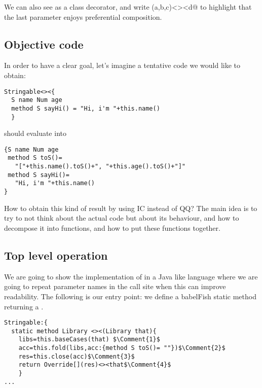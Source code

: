 We can also see \Q@Override@ as a class decorator, and
write \Q@Override(a,b,c)<><d@ to highlight that the last parameter enjoys preferential composition.

\subsection*{Objective code}
In order to have a clear goal,
let's imagine a tentative code we would like to obtain:

\begin{lstlisting}
Stringable<><{
  S name Num age
  method S sayHi() = "Hi, i'm "+this.name()
  }
\end{lstlisting}

\noindent should evaluate into

\begin{lstlisting}
{S name Num age
 method S toS()=
   "["+this.name().toS()+", "+this.age().toS()+"]"
 method S sayHi()=
   "Hi, i'm "+this.name()
}
\end{lstlisting}

How to obtain this kind of result by using IC instead of QQ?
The main idea is to try to not think about the actual code but about
its behaviour, and how to decompose it into functions, and how to
put these functions together.



\subsection*{Top level operation}
We are going to show the implementation of \Q@Stringable@ in a Java like language where
we are going to repeat parameter names in the call site when this can improve readability.
The following is our entry point: we define a babelFish static method
returning a \Q@Library@.

\begin{lstlisting}
Stringable:{
  static method Library <><(Library that){
    libs=this.baseCases(that) $\Comment{1}$
    acc=this.fold(libs,acc:{method S toS()= ""})$\Comment{2}$
    res=this.close(acc)$\Comment{3}$
    return Override[](res)<><that$\Comment{4}$
    }
...
\end{lstlisting}



